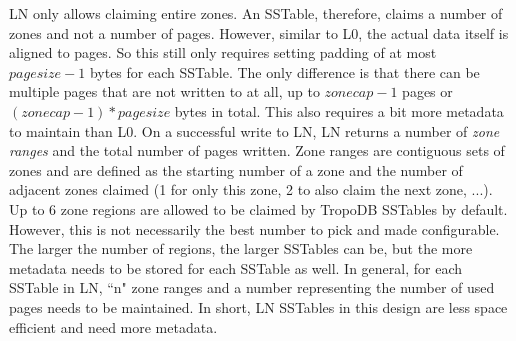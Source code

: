 LN only allows claiming entire zones. An SSTable, therefore, claims a number of zones and not a number of pages. However, similar to L0, the actual data itself is aligned to pages. So this still only requires setting padding of at most $pagesize-1$ bytes for each SSTable. The only difference is that there can be multiple pages that are not written to at all, up to $zonecap-1$ pages or $(zonecap-1)*pagesize$ bytes in total. This also requires a bit more metadata to maintain than L0. On a successful write to LN, LN returns a number of \textit{zone ranges} and the total number of pages written. Zone ranges are contiguous sets of zones and are defined as the starting number of a zone and the number of adjacent zones claimed (1 for only this zone, 2 to also claim the next zone, ...). Up to 6 zone regions are allowed to be claimed by TropoDB SSTables by default. However, this is not necessarily the best number to pick and made configurable. The larger the number of regions, the larger SSTables can be, but the more metadata needs to be stored for each SSTable as well. In general, for each SSTable in LN, ``n" zone ranges and a number representing the number of used pages needs to be maintained. In short, LN SSTables in this design are less space efficient and need more metadata. 

